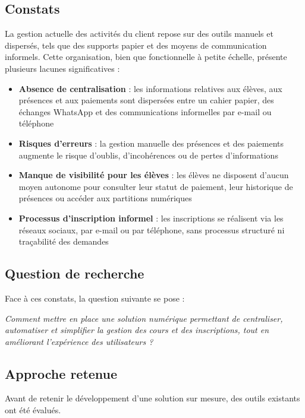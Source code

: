 \documentclass{article}
\begin{document}
\subsection{Constats}

La gestion actuelle des activités du client repose sur des outils 
manuels et dispersés, tels que des supports papier et des moyens 
de communication informels. Cette organisation, bien que fonctionnelle 
à petite échelle, présente plusieurs lacunes significatives :

\begin{itemize}
    \item \textbf{Absence de centralisation} : les informations 
    relatives aux élèves, aux présences et aux paiements sont 
    dispersées entre un cahier papier, des échanges WhatsApp et 
    des communications informelles par e-mail ou téléphone
    \item \textbf{Risques d'erreurs} : la gestion manuelle des 
    présences et des paiements augmente le risque d'oublis, 
    d'incohérences ou de pertes d'informations
    \item \textbf{Manque de visibilité pour les élèves} : les 
    élèves ne disposent d'aucun moyen autonome pour consulter 
    leur statut de paiement, leur historique de présences ou 
    accéder aux partitions numériques
    \item \textbf{Processus d'inscription informel} : les 
    inscriptions se réalisent via les réseaux sociaux, par 
    e-mail ou par téléphone, sans processus structuré ni 
    traçabilité des demandes
\end{itemize}

\subsection{Question de recherche}

Face à ces constats, la question suivante se pose :

\textit{Comment mettre en place une solution numérique permettant 
de centraliser, automatiser et simplifier la gestion des cours 
et des inscriptions, tout en améliorant l'expérience des 
utilisateurs ?}

\subsection{Approche retenue}

Avant de retenir le développement d'une solution sur mesure, 
des outils existants ont été évalués.
\end{document}
